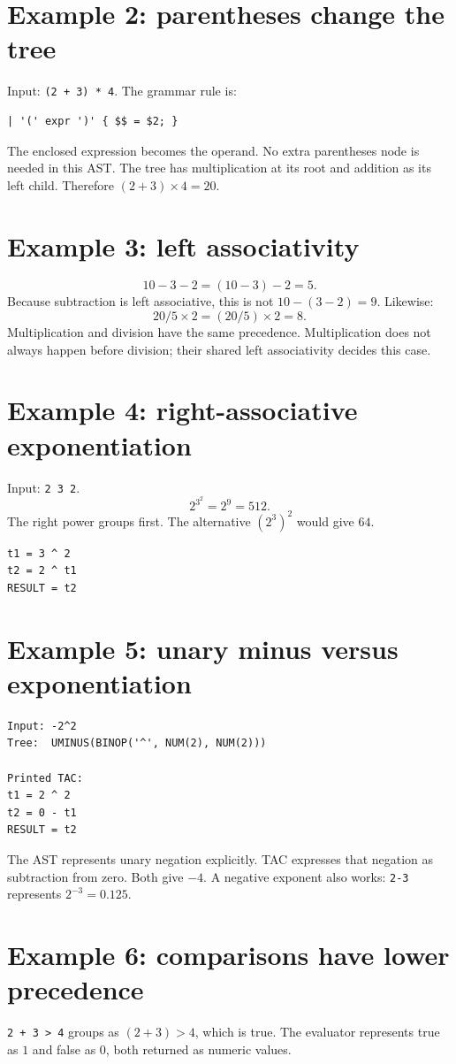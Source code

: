 \documentclass[11pt,a4paper]{report}
\begin{document}
\section{Example 2: parentheses change the tree}
Input: \texttt{(2 + 3) * 4}. The grammar rule is:
\begin{lstlisting}
| '(' expr ')' { $$ = $2; }
\end{lstlisting}
The enclosed expression becomes the operand. No extra parentheses node is
needed in this AST. The tree has multiplication at its root and addition as
its left child. Therefore $(2+3)\times4=20$.

\section{Example 3: left associativity}
\[
10-3-2=(10-3)-2=5.
\]
Because subtraction is left associative, this is not $10-(3-2)=9$.
Likewise:
\[
20/5\times2=(20/5)\times2=8.
\]
Multiplication and division have the same precedence. Multiplication does not
always happen before division; their shared left associativity decides this case.

\section{Example 4: right-associative exponentiation}
Input: \texttt{2 3 2}.
\[
2^{3^2}=2^9=512.
\]
The right power groups first. The alternative $(2^3)^2$ would give $64$.
\begin{lstlisting}
t1 = 3 ^ 2
t2 = 2 ^ t1
RESULT = t2
\end{lstlisting}

\section{Example 5: unary minus versus exponentiation}
\begin{lstlisting}
Input: -2^2
Tree:  UMINUS(BINOP('^', NUM(2), NUM(2)))

Printed TAC:
t1 = 2 ^ 2
t2 = 0 - t1
RESULT = t2
\end{lstlisting}
The AST represents unary negation explicitly. TAC expresses that negation as
subtraction from zero. Both give $-4$.
A negative exponent also works: \texttt{2-3} represents $2^{-3}=0.125$.

\section{Example 6: comparisons have lower precedence}
\texttt{2 + 3 > 4} groups as $(2+3)>4$, which is true. The evaluator represents
true as $1$ and false as $0$, both returned as numeric values.
\end{document}
